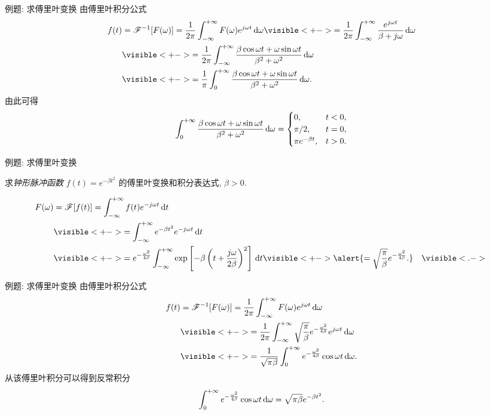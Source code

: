 \begin{frame}{例题: 求傅里叶变换}
\onslide<+->
由傅里叶积分公式
\begin{align*}
f(t)&=\msf^{-1}[F(\omega)]=\frac1{2\pi}\int_{-\infty}^{+\infty}F(\omega)e^{j\omega t}\diff\omega
\visible<+->{=\frac1{2\pi}\int_{-\infty}^{+\infty}\frac{e^{j\omega t}}{\beta+j\omega}\diff\omega}\\
&\visible<+->{=\frac1{2\pi}\int_{-\infty}^{+\infty}\frac{\beta\cos{\omega t}+\omega\sin{\omega t}}{\beta^2+\omega^2}\diff\omega}\\
&\visible<+->{=\frac1\pi\int_0^{+\infty}\frac{\beta\cos{\omega t}+\omega\sin{\omega t}}{\beta^2+\omega^2}\diff\omega.}
\end{align*}
\onslide<+->
由此可得
\[\int_0^{+\infty}\frac{\beta\cos{\omega t}+\omega\sin{\omega t}}{\beta^2+\omega^2}\,\mathrm{d}\omega=
	\begin{cases}
		0,&t<0,\\
		\pi/2,&t=0,\\
		\pi e^{-\beta t},&t>0.
	\end{cases}\]
\end{frame}


\begin{frame}{例题: 求傅里叶变换}
\begin{example}
求\emph{钟形脉冲函数} $f(t)=e^{-\beta t^2}$ 的傅里叶变换和积分表达式, $\beta>0$.
\end{example}
\begin{solution}
\vspace{-\baselineskip}
\begin{align*}
F(\omega)&=\msf[f(t)]=\int_{-\infty}^{+\infty}f(t)e^{-j\omega t}\diff t\\
&\visible<+->{=\int_{-\infty}^{+\infty}e^{-\beta t^2}e^{-j\omega t}\diff t}\\
&\visible<+->{=e^{-\frac{\omega^2}{4\beta}}\int_{-\infty}^{+\infty}\exp\left[-\beta\left(t+\frac{j\omega}{2\beta}\right)^2\right]\diff t}
\visible<+->{\alert{=\sqrt{\frac\pi\beta}e^{-\frac{\omega^2}{4\beta}}.}}&\visible<.->{}
\end{align*}
\end{solution}
\end{frame}


\begin{frame}{例题: 求傅里叶变换}
\onslide<+->
由傅里叶积分公式
\begin{align*}
f(t)&=\msf^{-1}[F(\omega)]=\frac1{2\pi}\int_{-\infty}^{+\infty}F(\omega)e^{j\omega t}\diff\omega\\
&\visible<+->{=\frac1{2\pi}\int_{-\infty}^{+\infty}\sqrt{\frac\pi\beta}e^{-\frac{\omega^2}{4\beta}}e^{j\omega t}\diff\omega}\\
&\visible<+->{=\frac1{\sqrt{\pi\beta}}\int_0^{+\infty}e^{-\frac{\omega^2}{4\beta}}\cos{\omega t}\diff\omega.}
\end{align*}
\onslide<+->
从该傅里叶积分可以得到反常积分
\[\int_0^{+\infty}e^{-\frac{\omega^2}{4\beta}}\cos{\omega t}\,\mathrm{d}\omega=\sqrt{\pi\beta}e^{-\beta t^2}.\]
\end{frame}



